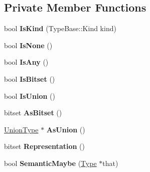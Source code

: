 \subsection*{Private Member Functions}
\begin{DoxyCompactItemize}
\item 
bool {\bfseries Is\+Kind} (Type\+Base\+::\+Kind kind)\hypertarget{classv8_1_1internal_1_1_type_a4faebbfc192341a9ff80316bf630b6d0}{}\label{classv8_1_1internal_1_1_type_a4faebbfc192341a9ff80316bf630b6d0}

\item 
bool {\bfseries Is\+None} ()\hypertarget{classv8_1_1internal_1_1_type_ab92b1de0380aa7f049d89301d55e9cba}{}\label{classv8_1_1internal_1_1_type_ab92b1de0380aa7f049d89301d55e9cba}

\item 
bool {\bfseries Is\+Any} ()\hypertarget{classv8_1_1internal_1_1_type_a1ba7d08b3127aeec4ba394b206258f4a}{}\label{classv8_1_1internal_1_1_type_a1ba7d08b3127aeec4ba394b206258f4a}

\item 
bool {\bfseries Is\+Bitset} ()\hypertarget{classv8_1_1internal_1_1_type_a11786a2613f4bb49526c70f3d112b55d}{}\label{classv8_1_1internal_1_1_type_a11786a2613f4bb49526c70f3d112b55d}

\item 
bool {\bfseries Is\+Union} ()\hypertarget{classv8_1_1internal_1_1_type_a37b00ea6126bb383d5c89b9b1c012b86}{}\label{classv8_1_1internal_1_1_type_a37b00ea6126bb383d5c89b9b1c012b86}

\item 
bitset {\bfseries As\+Bitset} ()\hypertarget{classv8_1_1internal_1_1_type_a4b96cc3f652b8c13a7432b5b745bec43}{}\label{classv8_1_1internal_1_1_type_a4b96cc3f652b8c13a7432b5b745bec43}

\item 
\hyperlink{classv8_1_1internal_1_1_union_type}{Union\+Type} $\ast$ {\bfseries As\+Union} ()\hypertarget{classv8_1_1internal_1_1_type_a096e0fc00feda60de343e4bb16966403}{}\label{classv8_1_1internal_1_1_type_a096e0fc00feda60de343e4bb16966403}

\item 
bitset {\bfseries Representation} ()\hypertarget{classv8_1_1internal_1_1_type_a1869a60a0009f53fe6cf5a0e8261ba47}{}\label{classv8_1_1internal_1_1_type_a1869a60a0009f53fe6cf5a0e8261ba47}

\item 
bool {\bfseries Semantic\+Maybe} (\hyperlink{classv8_1_1internal_1_1_type}{Type} $\ast$that)\hypertarget{classv8_1_1internal_1_1_type_aecf3917c101abc4cfc0440fda6dabb53}{}\label{classv8_1_1internal_1_1_type_aecf3917c101abc4cfc0440fda6dabb53}


\end{DoxyCompactItemize}
